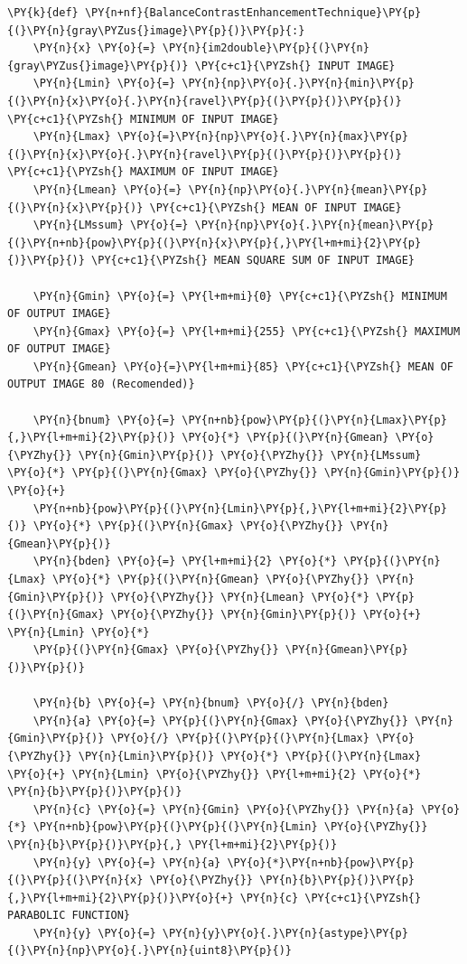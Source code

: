 \begin{tcolorbox}[breakable, size=fbox, boxrule=1pt, pad at break*=1mm,colback=cellbackground, colframe=cellborder]
	\begin{Verbatim}[commandchars=\\\{\}]
\PY{k}{def} \PY{n+nf}{BalanceContrastEnhancementTechnique}\PY{p}{(}\PY{n}{gray\PYZus{}image}\PY{p}{)}\PY{p}{:}
    \PY{n}{x} \PY{o}{=} \PY{n}{im2double}\PY{p}{(}\PY{n}{gray\PYZus{}image}\PY{p}{)} \PY{c+c1}{\PYZsh{} INPUT IMAGE}
    \PY{n}{Lmin} \PY{o}{=} \PY{n}{np}\PY{o}{.}\PY{n}{min}\PY{p}{(}\PY{n}{x}\PY{o}{.}\PY{n}{ravel}\PY{p}{(}\PY{p}{)}\PY{p}{)} \PY{c+c1}{\PYZsh{} MINIMUM OF INPUT IMAGE}
    \PY{n}{Lmax} \PY{o}{=}\PY{n}{np}\PY{o}{.}\PY{n}{max}\PY{p}{(}\PY{n}{x}\PY{o}{.}\PY{n}{ravel}\PY{p}{(}\PY{p}{)}\PY{p}{)} \PY{c+c1}{\PYZsh{} MAXIMUM OF INPUT IMAGE}
    \PY{n}{Lmean} \PY{o}{=} \PY{n}{np}\PY{o}{.}\PY{n}{mean}\PY{p}{(}\PY{n}{x}\PY{p}{)} \PY{c+c1}{\PYZsh{} MEAN OF INPUT IMAGE}
    \PY{n}{LMssum} \PY{o}{=} \PY{n}{np}\PY{o}{.}\PY{n}{mean}\PY{p}{(}\PY{n+nb}{pow}\PY{p}{(}\PY{n}{x}\PY{p}{,}\PY{l+m+mi}{2}\PY{p}{)}\PY{p}{)} \PY{c+c1}{\PYZsh{} MEAN SQUARE SUM OF INPUT IMAGE}

    \PY{n}{Gmin} \PY{o}{=} \PY{l+m+mi}{0} \PY{c+c1}{\PYZsh{} MINIMUM OF OUTPUT IMAGE}
    \PY{n}{Gmax} \PY{o}{=} \PY{l+m+mi}{255} \PY{c+c1}{\PYZsh{} MAXIMUM OF OUTPUT IMAGE}
    \PY{n}{Gmean} \PY{o}{=}\PY{l+m+mi}{85} \PY{c+c1}{\PYZsh{} MEAN OF OUTPUT IMAGE 80 (Recomended)}

    \PY{n}{bnum} \PY{o}{=} \PY{n+nb}{pow}\PY{p}{(}\PY{n}{Lmax}\PY{p}{,}\PY{l+m+mi}{2}\PY{p}{)} \PY{o}{*} \PY{p}{(}\PY{n}{Gmean} \PY{o}{\PYZhy{}} \PY{n}{Gmin}\PY{p}{)} \PY{o}{\PYZhy{}} \PY{n}{LMssum} \PY{o}{*} \PY{p}{(}\PY{n}{Gmax} \PY{o}{\PYZhy{}} \PY{n}{Gmin}\PY{p}{)} \PY{o}{+}
    \PY{n+nb}{pow}\PY{p}{(}\PY{n}{Lmin}\PY{p}{,}\PY{l+m+mi}{2}\PY{p}{)} \PY{o}{*} \PY{p}{(}\PY{n}{Gmax} \PY{o}{\PYZhy{}} \PY{n}{Gmean}\PY{p}{)}
    \PY{n}{bden} \PY{o}{=} \PY{l+m+mi}{2} \PY{o}{*} \PY{p}{(}\PY{n}{Lmax} \PY{o}{*} \PY{p}{(}\PY{n}{Gmean} \PY{o}{\PYZhy{}} \PY{n}{Gmin}\PY{p}{)} \PY{o}{\PYZhy{}} \PY{n}{Lmean} \PY{o}{*} \PY{p}{(}\PY{n}{Gmax} \PY{o}{\PYZhy{}} \PY{n}{Gmin}\PY{p}{)} \PY{o}{+} \PY{n}{Lmin} \PY{o}{*}
    \PY{p}{(}\PY{n}{Gmax} \PY{o}{\PYZhy{}} \PY{n}{Gmean}\PY{p}{)}\PY{p}{)}

    \PY{n}{b} \PY{o}{=} \PY{n}{bnum} \PY{o}{/} \PY{n}{bden}
    \PY{n}{a} \PY{o}{=} \PY{p}{(}\PY{n}{Gmax} \PY{o}{\PYZhy{}} \PY{n}{Gmin}\PY{p}{)} \PY{o}{/} \PY{p}{(}\PY{p}{(}\PY{n}{Lmax} \PY{o}{\PYZhy{}} \PY{n}{Lmin}\PY{p}{)} \PY{o}{*} \PY{p}{(}\PY{n}{Lmax} \PY{o}{+} \PY{n}{Lmin} \PY{o}{\PYZhy{}} \PY{l+m+mi}{2} \PY{o}{*} \PY{n}{b}\PY{p}{)}\PY{p}{)}
    \PY{n}{c} \PY{o}{=} \PY{n}{Gmin} \PY{o}{\PYZhy{}} \PY{n}{a} \PY{o}{*} \PY{n+nb}{pow}\PY{p}{(}\PY{p}{(}\PY{n}{Lmin} \PY{o}{\PYZhy{}} \PY{n}{b}\PY{p}{)}\PY{p}{,} \PY{l+m+mi}{2}\PY{p}{)}
    \PY{n}{y} \PY{o}{=} \PY{n}{a} \PY{o}{*}\PY{n+nb}{pow}\PY{p}{(}\PY{p}{(}\PY{n}{x} \PY{o}{\PYZhy{}} \PY{n}{b}\PY{p}{)}\PY{p}{,}\PY{l+m+mi}{2}\PY{p}{)}\PY{o}{+} \PY{n}{c} \PY{c+c1}{\PYZsh{} PARABOLIC FUNCTION}
    \PY{n}{y} \PY{o}{=} \PY{n}{y}\PY{o}{.}\PY{n}{astype}\PY{p}{(}\PY{n}{np}\PY{o}{.}\PY{n}{uint8}\PY{p}{)}


\end{Verbatim}
\end{tcolorbox}
